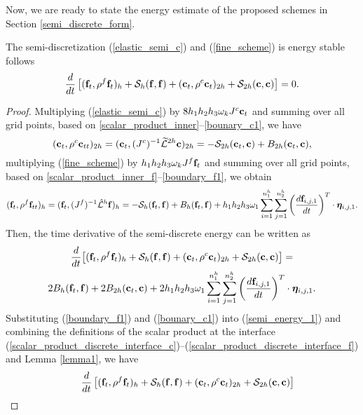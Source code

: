 Now, we are ready to state the energy estimate of the proposed schemes in Section \ref{semi_discrete_form}. 
 \begin{theorem}\label{thm1}
  The semi-discretization (\ref{elastic_semi_c}) and (\ref{fine_scheme}) is energy stable follows
  \[
  \frac{d}{dt}\left[({\bf f}_t,\rho^f {\bf f}_t)_{h} + \mathcal{S}_{h}({\bf f},{\bf f}) + ({\bf c}_t,\rho^{c} {\bf c}_t)_{2h} + \mathcal{S}_{2h}({\bf c},{\bf c}) \right]   = 0.
  \]
 \end{theorem}
 \begin{proof}
 Multiplying (\ref{elastic_semi_c}) by $8h_1h_2h_3\omega_kJ^{c}{\bf c}_t$ and summing over all grid points, based on \eqref{scalar_product_inner}--\eqref{bounary_c1}, we have
\begin{equation*}\label{coarse_simple}
({\bf c}_t, {\rho}^{c}{\bf c}_{tt})_{2h} = ({\bf c}_t,({J^c})^{-1}\wt{\mathcal{L}}^{2h}{\bf c})_{2h} = -\mathcal{S}_{2h}({\bf c}_t,{\bf c}) + B_{2h}({\bf c}_t,{{\bf c}}),
\end{equation*}
multiplying (\ref{fine_scheme}) by $h_1h_2h_3\omega_kJ^f{\bf f}_t$ and summing over all grid points, based on \eqref{scalar_product_inner_f}--\eqref{boundary_f1}, we obtain
\begin{equation*}
({\bf f}_t, {\rho}^f{\bf f}_{tt})_h = ({\bf f}_t,({J^f})^{-1}\hat{\mathcal{L}}^h{\bf f})_h = -\mathcal{S}_{h}({\bf f}_t,{\bf f}) + B_h({\bf f}_t,{\bf f}) 
+h_1h_2h_3\omega_1\sum_{i = 1}^{n_1^h}\sum_{j=1}^{n_2^h} \left(\frac{d{\bf f}_{i,j,1}}{dt}\right)^T\cdot{\bm \eta}_{i,j,1}.
\end{equation*}
Then, the time derivative of the semi-discrete energy can be written as
\begin{multline}\label{semi_energy_1}
\frac{d}{dt}\big[({\bf f}_t,\rho^f {\bf f}_t)_h + \mathcal{S}_{h}({\bf f},{\bf f}) + ({\bf c}_t,\rho^{c} {\bf c}_t)_{2h} + \mathcal{S}_{2h}({\bf c},{\bf c}) \big]  = \\
2B_{h}({\bf f}_t,{\bf f}) + 2B_{2h}({\bf c}_t,{\bf c}) + 2h_1h_2h_3\omega_1\sum_{i = 1}^{n_1^h}\sum_{j=1}^{n_2^h}\left(\frac{d{\bf f}_{i,j,1}}{dt}\right)^T\cdot{\bm \eta}_{i,j,1}.
\end{multline}
Substituting (\ref{boundary_f1}) and (\ref{bounary_c1}) into (\ref{semi_energy_1}) and combining the definitions of the scalar product at the interface (\ref{scalar_product_discrete_interface_c})--(\ref{scalar_product_discrete_interface_f}) and Lemma \ref{lemma1}, we have
\begin{align*}\label{semi_energy_2}
&\hspace{0.4cm}\frac{d}{dt}\left[({\bf f}_t,\rho^f {\bf f}_t)_{h} + \mathcal{S}_{h}({\bf f},{\bf f}) + ({\bf c}_t,\rho^{c} {\bf c}_t)_{2h} + \mathcal{S}_{2h}({\bf c},{\bf c}) \right]   \nonumber\\

\end{align*}
\end{proof}
